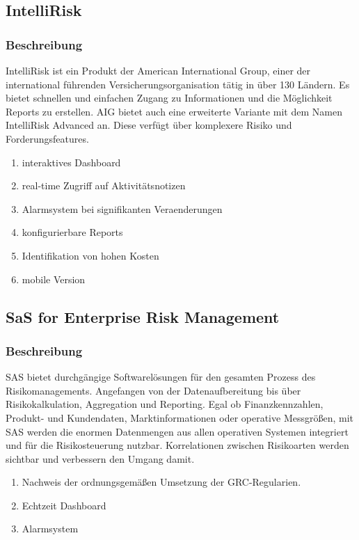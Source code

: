 \subsection{IntelliRisk}
\subsubsection{Beschreibung}

IntelliRisk ist ein Produkt der American International Group, einer der international führenden Versicherungsorganisation tätig in über 130 Ländern. Es bietet schnellen und einfachen Zugang zu Informationen und die Möglichkeit Reports zu erstellen. AIG bietet auch eine erweiterte Variante mit dem Namen IntelliRisk Advanced an. Diese verfügt über komplexere Risiko und Forderungsfeatures.\cite{AIG}
\begin{enumerate}
\item interaktives Dashboard
\item real-time Zugriff auf Aktivitätsnotizen
\item Alarmsystem bei signifikanten Veraenderungen
\item konfigurierbare Reports
\item Identifikation von hohen Kosten
\item mobile Version
\end{enumerate}


\subsection{SaS for Enterprise Risk Management}
\subsubsection{Beschreibung}
SAS bietet durchgängige Softwarelösungen für den gesamten Prozess des Risikomanagements. Angefangen von der Datenaufbereitung bis über Risikokalkulation, Aggregation und Reporting. Egal ob Finanzkennzahlen, Produkt- und Kundendaten, Marktinformationen oder operative Messgrößen, mit SAS werden die enormen Datenmengen aus allen operativen Systemen integriert und für die Risikosteuerung nutzbar. Korrelationen zwischen Risikoarten werden sichtbar und verbessern den Umgang damit.

\begin{enumerate}
\item Nachweis der ordnungsgemäßen Umsetzung der GRC-Regularien.
\item Echtzeit Dashboard
\item Alarmsystem
\end{enumerate}

